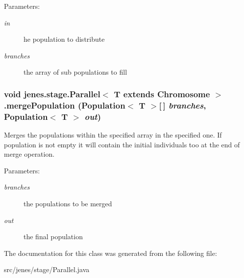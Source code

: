 \begin{Desc}
\item[Parameters:]
\begin{description}
\item[{\em in}]he population to distribute \item[{\em branches}]the array of sub populations to fill \end{description}
\end{Desc}
\hypertarget{classjenes_1_1stage_1_1_parallel_3_01_t_01extends_01_chromosome_01_4_9cd26799d837f1e1f5ddfcabd0d18aaa}{
\subsubsection[mergePopulation]{\setlength{\rightskip}{0pt plus 5cm}void jenes.stage.Parallel$<$ T extends Chromosome $>$.mergePopulation (Population$<$ T $>$\mbox{[}$\,$\mbox{]} {\em branches}, \/  Population$<$ T $>$ {\em out})}}
\label{classjenes_1_1stage_1_1_parallel_3_01_t_01extends_01_chromosome_01_4_9cd26799d837f1e1f5ddfcabd0d18aaa}


Merges the populations within the specified array in the specified one. If population is not empty it will contain the initial individuals too at the end of merge operation. 

\begin{Desc}
\item[Parameters:]
\begin{description}
\item[{\em branches}]the populations to be merged \item[{\em out}]the final population \end{description}
\end{Desc}


The documentation for this class was generated from the following file:\begin{CompactItemize}
\item 
src/jenes/stage/Parallel.java\end{CompactItemize}
